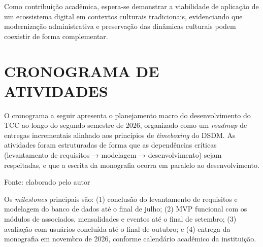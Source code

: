 ﻿\documentclass[12pt,a4paper]{article}
\newcommand{\fonte}[1]{\par\vspace{2pt}\footnotesize{Fonte: #1}}
\begin{document}
Como contribuição acadêmica, espera-se demonstrar a viabilidade de aplicação de um ecossistema digital em contextos culturais tradicionais, evidenciando que modernização administrativa e preservação das dinâmicas culturais podem coexistir de forma complementar.

\section{CRONOGRAMA DE ATIVIDADES}

O cronograma a seguir apresenta o planejamento macro do desenvolvimento do TCC ao longo do segundo semestre de 2026, organizado como um \textit{roadmap} de entregas incrementais alinhado aos princípios de \textit{timeboxing} do DSDM. As atividades foram estruturadas de forma que as dependências críticas (levantamento de requisitos → modelagem → desenvolvimento) sejam respeitadas, e que a escrita da monografia ocorra em paralelo ao desenvolvimento.
\nopagebreak[4]
\begin{center}
\label{tab:cronograma}
\fonte{elaborado pelo autor}
\end{center}

Os \textit{milestones} principais são: (1) conclusão do levantamento de requisitos e modelagem do banco de dados até o final de julho; (2) MVP funcional com os módulos de associados, mensalidades e eventos até o final de setembro; (3) avaliação com usuários concluída até o final de outubro; e (4) entrega da monografia em novembro de 2026, conforme calendário acadêmico da instituição.



\end{document}
